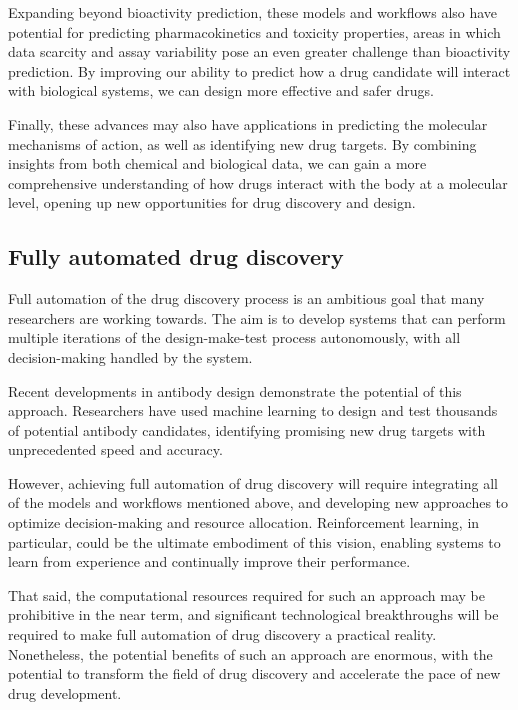 Expanding beyond bioactivity prediction, these models and workflows also have potential for predicting pharmacokinetics and toxicity properties, areas in which data scarcity and assay variability pose an even greater challenge than bioactivity prediction. By improving our ability to predict how a drug candidate will interact with biological systems, we can design more effective and safer drugs.

Finally, these advances may also have applications in predicting the molecular mechanisms of action, as well as identifying new drug targets. By combining insights from both chemical and biological data, we can gain a more comprehensive understanding of how drugs interact with the body at a molecular level, opening up new opportunities for drug discovery and design.

\subsection{Fully automated drug discovery}
Full automation of the drug discovery process is an ambitious goal that many researchers are working towards. The aim is to develop systems that can perform multiple iterations of the design-make-test process autonomously, with all decision-making handled by the system.

Recent developments in antibody design demonstrate the potential of this approach. Researchers have used machine learning to design and test thousands of potential antibody candidates, identifying promising new drug targets with unprecedented speed and accuracy.

However, achieving full automation of drug discovery will require integrating all of the models and workflows mentioned above, and developing new approaches to optimize decision-making and resource allocation. Reinforcement learning, in particular, could be the ultimate embodiment of this vision, enabling systems to learn from experience and continually improve their performance.

That said, the computational resources required for such an approach may be prohibitive in the near term, and significant technological breakthroughs will be required to make full automation of drug discovery a practical reality. Nonetheless, the potential benefits of such an approach are enormous, with the potential to transform the field of drug discovery and accelerate the pace of new drug development.
